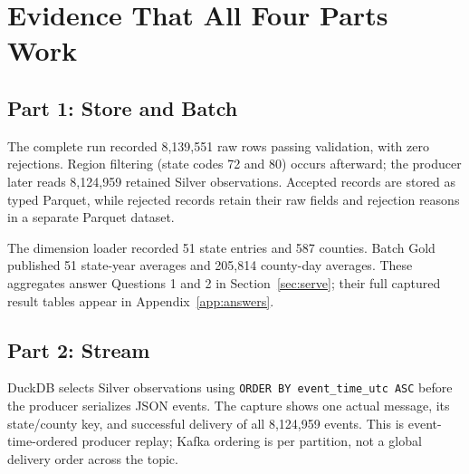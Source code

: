 \documentclass[11pt,letterpaper]{article}
\newcommand{\reportdir}{.}
\newcommand{\reportdir}{documentation}
\newcommand{\captureroot}{\reportdir/evidence/run-59ewk1}
\begin{document}
\section{Evidence That All Four Parts Work}

\subsection{Part 1: Store and Batch}
The complete run recorded 8,139,551 raw rows passing validation, with zero
rejections. Region filtering (state codes 72 and 80) occurs afterward; the
producer later reads 8,124,959 retained Silver observations. Accepted records
are stored as typed Parquet, while rejected records retain their raw fields
and rejection reasons in a separate Parquet dataset.

\noindent\begin{minipage}{\linewidth}

\end{minipage}

The dimension loader recorded 51 state entries and 587 counties. Batch Gold
published 51 state-year averages and 205,814 county-day averages. These
aggregates answer Questions 1 and 2 in Section~\ref{sec:serve}; their full
captured result tables appear in Appendix~\ref{app:answers}.

\noindent\begin{minipage}{\linewidth}

\end{minipage}

\noindent\begin{minipage}{\linewidth}

\end{minipage}

\subsection{Part 2: Stream}
DuckDB selects Silver observations using \texttt{ORDER BY event\_time\_utc ASC}
before the producer serializes JSON events. The capture shows one actual
message, its state/county key, and successful delivery of all 8,124,959 events.
This is event-time-ordered producer replay; Kafka ordering is per partition,
not a global delivery order across the topic.
\end{document}
